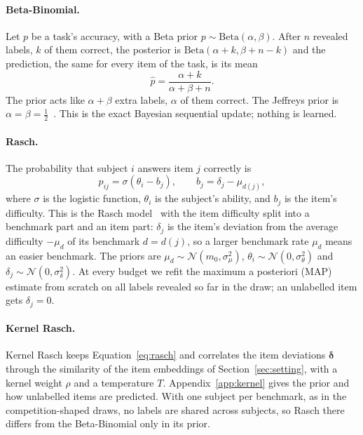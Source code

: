 \documentclass{article}
\begin{document}
\paragraph{Beta-Binomial.} Let $p$ be a task's accuracy, with a Beta prior $p\sim\mathrm{Beta}(\alpha,\beta)$. After $n$ revealed labels, $k$ of them correct, the posterior is $\mathrm{Beta}(\alpha+k,\beta+n-k)$ and the prediction, the same for every item of the task, is its mean
\begin{equation}\label{eq:bb}
\hat p=\frac{\alpha+k}{\alpha+\beta+n}.
\end{equation}
The prior acts like $\alpha+\beta$ extra labels, $\alpha$ of them correct. The Jeffreys prior is $\alpha=\beta=\tfrac12$~\citep{jeffreys1946}. This is the exact Bayesian sequential update; nothing is learned.

\paragraph{Rasch.} The probability that subject $i$ answers item $j$ correctly is
\begin{equation}\label{eq:rasch}
p_{ij}=\sigma(\theta_i-b_j),\qquad b_j=\delta_j-\mu_{d(j)},
\end{equation}
where $\sigma$ is the logistic function, $\theta_i$ is the subject's ability, and $b_j$ is the item's difficulty. This is the Rasch model~\citep{rasch1960} with the item difficulty split into a benchmark part and an item part: $\delta_j$ is the item's deviation from the average difficulty $-\mu_d$ of its benchmark $d=d(j)$, so a larger benchmark rate $\mu_d$ means an easier benchmark. The priors are $\mu_d\sim\mathcal N(m_0,\sigma_\mu^2)$, $\theta_i\sim\mathcal N(0,\sigma_\theta^2)$ and $\delta_j\sim\mathcal N(0,\sigma_\delta^2)$. At every budget we refit the maximum a posteriori (MAP) estimate from scratch on all labels revealed so far in the draw; an unlabelled item gets $\delta_j=0$. 
\paragraph{Kernel Rasch.} Kernel Rasch keeps Equation~\eqref{eq:rasch} and correlates the item deviations $\boldsymbol\delta$ through the similarity of the item embeddings of Section~\ref{sec:setting}, with a kernel weight $\rho$ and a temperature $T$. Appendix~\ref{app:kernel} gives the prior and how unlabelled items are predicted. With one subject per benchmark, as in the competition-shaped draws, no labels are shared across subjects, so Rasch there differs from the Beta-Binomial only in its prior.
\end{document}
